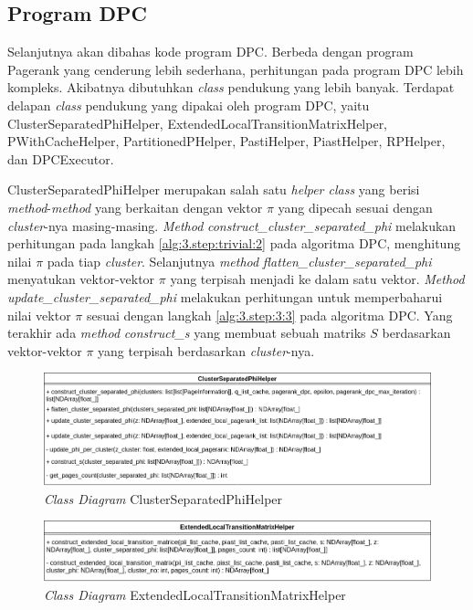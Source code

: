 \subsection{Program DPC}

\quad Selanjutnya akan dibahas kode program DPC. Berbeda dengan program Pagerank yang cenderung lebih sederhana, perhitungan pada program DPC lebih kompleks. Akibatnya dibutuhkan \textit{class} pendukung yang lebih banyak. Terdapat delapan \textit{class} pendukung yang dipakai oleh program DPC, yaitu ClusterSeparatedPhiHelper, ExtendedLocalTransitionMatrixHelper, PWithCacheHelper, PartitionedPHelper, PastiHelper, PiastHelper, RPHelper, dan DPCExecutor.

ClusterSeparatedPhiHelper merupakan salah satu \textit{helper class} yang berisi \textit{method}-\textit{method} yang berkaitan dengan vektor $\pi$ yang dipecah sesuai dengan \textit{cluster}-nya masing-masing. \textit{Method} \textit{construct\_cluster\_separated\_phi} melakukan perhitungan pada langkah \ref{alg:3.step:trivial:2} pada algoritma DPC, menghitung nilai $\pi$ pada tiap \textit{cluster}. Selanjutnya \textit{method} \textit{flatten\_cluster\_separated\_phi} menyatukan vektor-vektor $\pi$ yang terpisah menjadi ke dalam satu vektor. \textit{Method} \textit{update\_cluster\_separated\_phi} melakukan perhitungan untuk memperbaharui nilai vektor $\pi$ sesuai dengan langkah \ref{alg:3.step:3:3} pada algoritma DPC. Yang terakhir ada \textit{method} \textit{construct\_s} yang membuat sebuah matriks $S$ berdasarkan vektor-vektor $\pi$ yang terpisah berdasarkan \textit{cluster}-nya.

\begin{figure}[H]
  \centering
  \includegraphics[keepaspectratio, width={\textwidth}]{gambar/cluster_separated_phi_helper_class_diagram}
  \caption{\textit{Class Diagram} ClusterSeparatedPhiHelper}
	\label{gambar:cluster_separated_phi_helper_class_diagram}
\end{figure}

\begin{figure}[H]
  \centering
  \includegraphics[keepaspectratio, width={\textwidth}]{gambar/extended_local_transition_matrix_helper_class_diagram}
  \caption{\textit{Class Diagram} ExtendedLocalTransitionMatrixHelper}
	\label{gambar:extended_local_transition_matrix_helper_class_diagram}
\end{figure}

